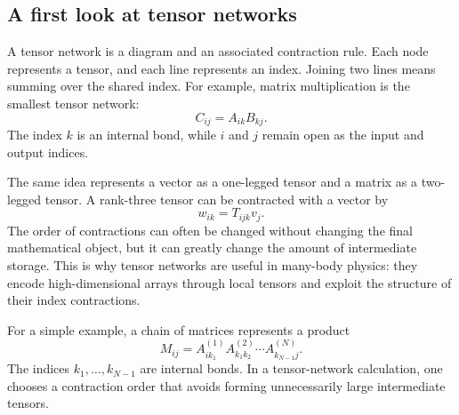 \subsection{A first look at tensor networks}
A tensor network is a diagram and an associated contraction rule. Each node represents a tensor, and each line represents an index. Joining two lines means summing over the shared index. For example, matrix multiplication is the smallest tensor network:
\begin{equation}
C_{ij}=A_{ik}B_{kj}.
\end{equation}
The index $k$ is an internal bond, while $i$ and $j$ remain open as the input and output indices.

The same idea represents a vector as a one-legged tensor and a matrix as a two-legged tensor. A rank-three tensor can be contracted with a vector by
\begin{equation}
w_{ik}=T_{ijk}v_j.
\end{equation}
The order of contractions can often be changed without changing the final mathematical object, but it can greatly change the amount of intermediate storage. This is why tensor networks are useful in many-body physics: they encode high-dimensional arrays through local tensors and exploit the structure of their index contractions.

For a simple example, a chain of matrices represents a product
\begin{equation}
M_{ij}=A^{(1)}_{ik_1}A^{(2)}_{k_1k_2}\cdots A^{(N)}_{k_{N-1}j}.
\end{equation}
The indices $k_1,\ldots,k_{N-1}$ are internal bonds. In a tensor-network calculation, one chooses a contraction order that avoids forming unnecessarily large intermediate tensors.
